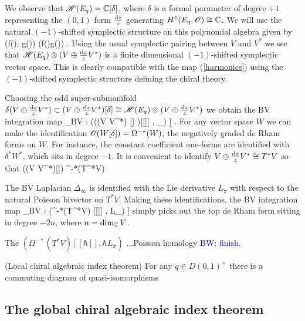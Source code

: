 \documentclass[10pt]{amsart}
\def\brian{\textcolor{blue}{BW: }\textcolor{blue}}
\begin{document}
We observe that $\mathscr H(E_q) = \mathbb C[\delta]$, where $\delta$ is a formal parameter of degree $+1$ representing the $(0,1)$ form $\frac{{\rm d} \Bar{z}}{\Bar{z}}$ generating $H^1(E_q , \mathscr O) \cong \mathbb C$. 
We will use the natural $(-1)$-shifted symplectic structure on this polynomial algebra given by 
\ben
(f(\delta), g(\delta)) \mapsto \frac{\partial}{\partial \delta} \left(f(\delta)g(\delta)\right) .
\een 
Using the usual symplectic pairing between $V$ and $V^*$ we see that $\mathscr H(E_q) \otimes (V \oplus \frac{{\rm d} z}{z} V^*)$ is a finite dimensional $(-1)$-shifted symplectic vector space. 
This is clearly compatible with the map (\ref{harmonics}) using the $(-1)$-shifted symplectic structure defining the chiral theory. 

Choosing the odd super-submanifold $\delta (V \oplus \frac{{\rm d} z}{z} V^*) \subset (V \oplus \frac{{\rm d} z}{z} V^*)[\delta] \cong \mathscr H(E_q) \otimes (V \oplus \frac{{\rm d} z}{z} V^*)$ we obtain the BV integration map 
\ben
\int_{BV} : \left(\sO\left((V \oplus {} V^*) [\delta] \right)[[\hbar]] , \hbar \Delta_\infty\right) \to \CC[[\hbar]] .
\een
For any vector space $W$ we can make the identification $\mathscr O(W[\delta]) = \Omega^{-*}(W)$, the negatively graded de Rham forms on $W$. 
For instance, the constant coefficient one-forms are identified with $\delta^* W^*$, which sits in degree $-1$. 
It is convenient to identify $V \oplus \frac{{\rm d} z}{z} V^* \cong T^*V$ so that
\ben
\sO\left((V \oplus {} V^*)[\delta]\right) \cong \Omega^{-*}(T^*V)
\een
 
The BV Laplacian $\Delta_\infty$ is identified with the Lie derivative $L_\pi$ with respect to the natural Poisson bivector on $T^*V$. 
Making these identifications, the BV integration map
\ben
\int_{BV} : \left(\Omega^{-*}(T^*V) [[\hbar]] , \hbar L_\pi\right) \to \CC[[\hbar]]
\een
simply picks out the top de Rham form sitting in degree $-2n$, where $n = \dim_\mathbb C V$. 

\begin{rmk} The $\left(\Omega^{-*}(T^*V) [[\hbar]] , \hbar L_\pi\right)$ ...Poisson homology \brian{finish}.
\end{rmk}


\begin{thm} (Local chiral algebraic index theorem) For any $q \in D(0,1)^\times$ there is a commuting diagram of quasi-isomorphisms
\ben
{}
\een
\end{thm}

\subsection{The global chiral algebraic index theorem}
\end{document}
